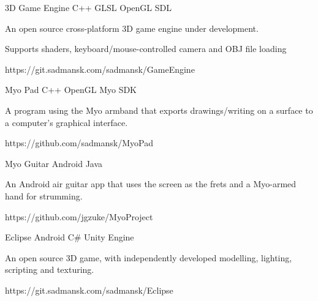 



\begin{cvprojects}

\cvproject
{3D Game Engine}
{C++ \textbullet{} GLSL \textbullet{} OpenGL \textbullet{} SDL}
{
An open source cross-platform 3D game engine under development.
\begin{cvitems}
\item[]
\item {Supports shaders, keyboard/mouse-controlled camera and OBJ file loading}
\end{cvitems}
}
{https://git.sadmansk.com/sadmansk/GameEngine}



\cvproject
{Myo Pad}
{C++ \textbullet{} OpenGL \textbullet{} Myo SDK}
{
A program using the Myo armband that exports drawings/writing on a surface to a computer's graphical interface.
    \begin{cvitems}\end{cvitems} %
}
{https://github.com/sadmansk/MyoPad}


\cvproject
{Myo Guitar}
{Android \textbullet{} Java}
{
An Android air guitar app that uses the screen as the frets and a Myo-armed hand for strumming.
    \begin{cvitems}\end{cvitems} %
}
{https://github.com/jgzuke/MyoProject}


\cvproject
{Eclipse}
    {Android \textbullet{} C\# \textbullet{} Unity Engine}
{
    An open source 3D game, with independently developed modelling, lighting, scripting and texturing.
            \begin{cvitems}\end{cvitems} %
}
{https://git.sadmansk.com/sadmansk/Eclipse}

\end{cvprojects}
